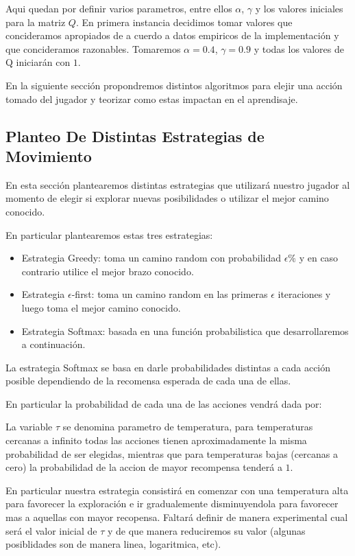 Aqui quedan por definir varios parametros, entre ellos $\alpha$, $\gamma$ y los valores iniciales para la matriz $Q$. En primera instancia decidimos tomar valores que concideramos apropiados de a cuerdo a datos empiricos de la implementación y que concideramos razonables. Tomaremos $\alpha=0.4 $, $\gamma=0.9$ y todas los valores de Q iniciarán con $1$.

En la siguiente sección propondremos distintos algoritmos para elejir una acción tomado del jugador y teorizar como estas impactan en el aprendisaje.

\subsection{Planteo De Distintas Estrategias de Movimiento}

En esta sección plantearemos distintas estrategias que utilizará nuestro jugador al momento de elegir si explorar nuevas posibilidades o utilizar el mejor camino conocido.

En particular plantearemos estas tres estrategias:


\begin{itemize}
\item Estrategia Greedy: toma un camino random con probabilidad $\epsilon\%$ y en caso contrario utilice el mejor brazo conocido.
\item Estrategia $\epsilon$-first: toma un camino random en las primeras $\epsilon$ iteraciones y luego toma el mejor camino conocido.
\item Estrategia Softmax: basada en una función probabilistica que desarrollaremos a continuación.
\end{itemize}

La estrategia Softmax se basa en darle probabilidades distintas a cada acción posible dependiendo de la recomensa esperada de cada una de ellas.

En particular la probabilidad de cada una de las acciones vendrá dada por:


 La variable $\tau$ se denomina parametro de temperatura, para temperaturas cercanas a infinito todas las acciones tienen aproximadamente la misma probabilidad de ser elegidas, mientras que para temperaturas bajas (cercanas a cero) la probabilidad de la accion de mayor recompensa tenderá a $1$.

En particular nuestra estrategia consistirá en comenzar con una temperatura alta para favorecer la exploración e ir gradualemente disminuyendola para favorecer mas a aquellas con mayor recopensa. Faltará definir de manera experimental cual será el valor inicial de $\tau$ y de que manera reduciremos su valor (algunas posiblidades son de manera linea, logaritmica, etc).


